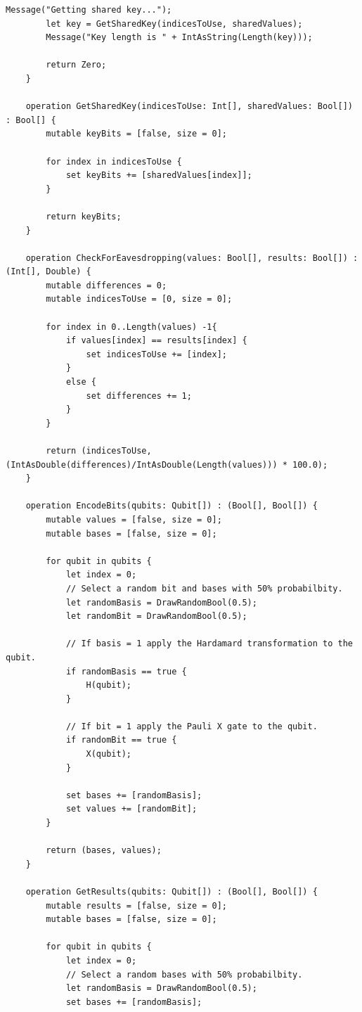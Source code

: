 \documentclass{article}
\begin{document}
\begin{lstlisting}[language={[Sharp]C}, caption={Q\# Microsoft Quantum Development Kit}, label={Script}]
        Message("Getting shared key...");
        let key = GetSharedKey(indicesToUse, sharedValues);
        Message("Key length is " + IntAsString(Length(key)));

        return Zero;
    }

    operation GetSharedKey(indicesToUse: Int[], sharedValues: Bool[]) : Bool[] {
        mutable keyBits = [false, size = 0];

        for index in indicesToUse {
            set keyBits += [sharedValues[index]];
        }

        return keyBits;
    }

    operation CheckForEavesdropping(values: Bool[], results: Bool[]) : (Int[], Double) {
        mutable differences = 0;
        mutable indicesToUse = [0, size = 0];

        for index in 0..Length(values) -1{
            if values[index] == results[index] {
                set indicesToUse += [index];
			}
            else {
                set differences += 1;
            }
        }

        return (indicesToUse, (IntAsDouble(differences)/IntAsDouble(Length(values))) * 100.0);
    }
    
    operation EncodeBits(qubits: Qubit[]) : (Bool[], Bool[]) {
        mutable values = [false, size = 0];
        mutable bases = [false, size = 0];

        for qubit in qubits {
            let index = 0;
            // Select a random bit and bases with 50% probabilbity.
            let randomBasis = DrawRandomBool(0.5);
            let randomBit = DrawRandomBool(0.5);

            // If basis = 1 apply the Hardamard transformation to the qubit.
            if randomBasis == true {
                H(qubit);
            }

            // If bit = 1 apply the Pauli X gate to the qubit.
            if randomBit == true {
                X(qubit);
            }

            set bases += [randomBasis];
            set values += [randomBit];
        }

        return (bases, values);
    }
    
    operation GetResults(qubits: Qubit[]) : (Bool[], Bool[]) {
        mutable results = [false, size = 0];
        mutable bases = [false, size = 0];

        for qubit in qubits {
            let index = 0;
            // Select a random bases with 50% probabilbity.
            let randomBasis = DrawRandomBool(0.5);
            set bases += [randomBasis];


\end{lstlisting}
\end{document}
